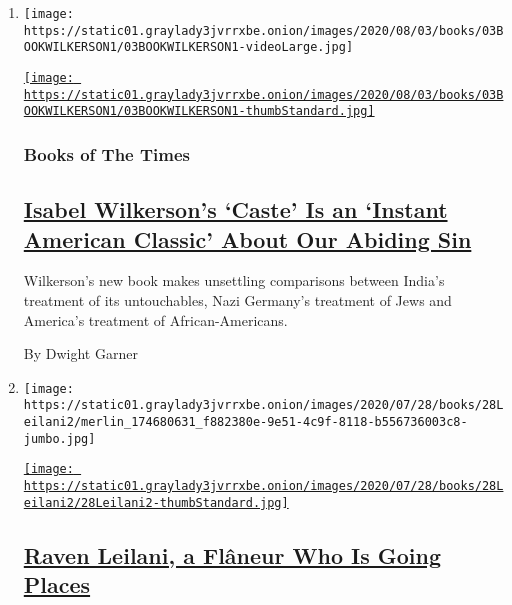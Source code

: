 \begin{enumerate}
\def\labelenumi{\arabic{enumi}.}
\item
  \texttt{[image: https://static01.graylady3jvrrxbe.onion/images/2020/08/03/books/03BOOKWILKERSON1/03BOOKWILKERSON1-videoLarge.jpg]}

  \href{/2020/07/31/books/review-caste-isabel-wilkerson-origins-of-our-discontents.html}{\texttt{[image: https://static01.graylady3jvrrxbe.onion/images/2020/08/03/books/03BOOKWILKERSON1/03BOOKWILKERSON1-thumbStandard.jpg]}}

  \hypertarget{books-of-the-times}{%
  \subsubsection{Books of The Times}\label{books-of-the-times}}

  \hypertarget{isabel-wilkersons-caste-is-an-instant-american-classic-about-our-abiding-sin}{%
  \subsection{\texorpdfstring{\href{/2020/07/31/books/review-caste-isabel-wilkerson-origins-of-our-discontents.html}{Isabel
  Wilkerson's `Caste' Is an `Instant American Classic' About Our Abiding
  Sin}}{Isabel Wilkerson's `Caste' Is an `Instant American Classic' About Our Abiding Sin}}\label{isabel-wilkersons-caste-is-an-instant-american-classic-about-our-abiding-sin}}

  Wilkerson's new book makes unsettling comparisons between India's
  treatment of its untouchables, Nazi Germany's treatment of Jews and
  America's treatment of African-Americans.

  By Dwight Garner
\item
  \texttt{[image: https://static01.graylady3jvrrxbe.onion/images/2020/07/28/books/28Leilani2/merlin\_174680631\_f882380e-9e51-4c9f-8118-b556736003c8-jumbo.jpg]}

  \href{/2020/07/31/books/raven-leilani-luster.html}{\texttt{[image: https://static01.graylady3jvrrxbe.onion/images/2020/07/28/books/28Leilani2/28Leilani2-thumbStandard.jpg]}}

  \hypertarget{raven-leilani-a-fluxe2neur-who-is-going-places}{%
  \subsection{\texorpdfstring{\href{/2020/07/31/books/raven-leilani-luster.html}{Raven
  Leilani, a Flâneur Who Is Going
  Places}}{Raven Leilani, a Flâneur Who Is Going Places}}\label{raven-leilani-a-fluxe2neur-who-is-going-places}}


\end{enumerate}
